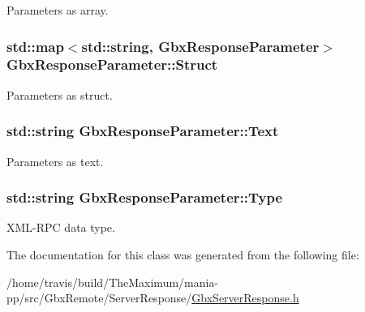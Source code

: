 Parameters as array. 

\hypertarget{classGbxResponseParameter_acc26f8d64983f92709d1fa38b8f33e66}{
\subsubsection[{Struct}]{\setlength{\rightskip}{0pt plus 5cm}std\-::map$<$std\-::string, {\bf Gbx\-Response\-Parameter}$>$ Gbx\-Response\-Parameter\-::\-Struct}}\label{classGbxResponseParameter_acc26f8d64983f92709d1fa38b8f33e66}


Parameters as struct. 

\hypertarget{classGbxResponseParameter_a2e5cb2904900fc74a47c35c0c2fafc55}{
\subsubsection[{Text}]{\setlength{\rightskip}{0pt plus 5cm}std\-::string Gbx\-Response\-Parameter\-::\-Text}}\label{classGbxResponseParameter_a2e5cb2904900fc74a47c35c0c2fafc55}


Parameters as text. 

\hypertarget{classGbxResponseParameter_aa1700ca65fa2526b112be24b5c0bdbf4}{
\subsubsection[{Type}]{\setlength{\rightskip}{0pt plus 5cm}std\-::string Gbx\-Response\-Parameter\-::\-Type}}\label{classGbxResponseParameter_aa1700ca65fa2526b112be24b5c0bdbf4}


X\-M\-L-\/\-R\-P\-C data type. 



The documentation for this class was generated from the following file\-:\begin{DoxyCompactItemize}
\item 
/home/travis/build/\-The\-Maximum/mania-\/pp/src/\-Gbx\-Remote/\-Server\-Response/\hyperlink{GbxServerResponse_8h}{Gbx\-Server\-Response.\-h}\end{DoxyCompactItemize}
